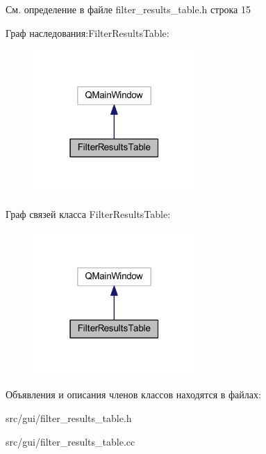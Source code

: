 См. определение в файле filter\+\_\+results\+\_\+table.\+h строка 15



Граф наследования\+:Filter\+Results\+Table\+:
\nopagebreak
\begin{figure}[H]
\begin{center}
\leavevmode
\includegraphics[width=175pt]{class_filter_results_table__inherit__graph}
\end{center}
\end{figure}


Граф связей класса Filter\+Results\+Table\+:
\nopagebreak
\begin{figure}[H]
\begin{center}
\leavevmode
\includegraphics[width=175pt]{class_filter_results_table__coll__graph}
\end{center}
\end{figure}


Объявления и описания членов классов находятся в файлах\+:\begin{DoxyCompactItemize}
\item 
src/gui/filter\+\_\+results\+\_\+table.\+h\item 
src/gui/filter\+\_\+results\+\_\+table.\+cc\end{DoxyCompactItemize}
